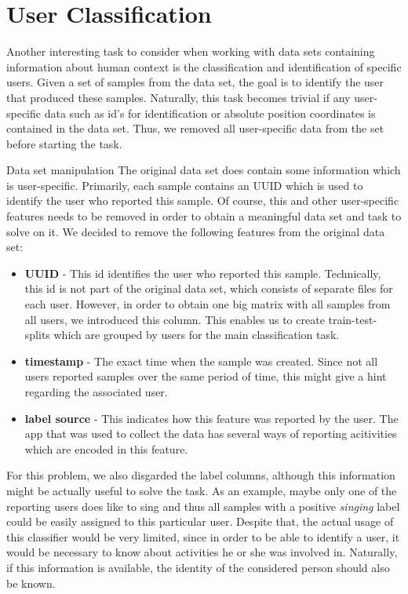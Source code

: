 \section{User Classification}\label{sec:user_classification}
Another interesting task to consider when working with data sets containing information about human context is the classification and identification of specific users. Given a set of samples from the data set, the goal is to identify the user that produced these samples. Naturally, this task becomes trivial if any user-specific data such as id's for identification or absolute position coordinates is contained in the data set. Thus, we removed all user-specific data from the set before starting the task.

\begin{subsection}{Data set manipulation}
	The original data set does contain some information which is user-specific. Primarily, each sample contains an UUID which is used to identify the user who reported this sample. Of course, this and other user-specific features needs to be removed in order to obtain a meaningful data set and task to solve on it. We decided to remove the following features from the original data set:
	\begin{itemize}
		\item \textbf{UUID} - This id identifies the user who reported this sample. Technically, this id is not part of the original data set, which consists of separate files for each user. However, in order to obtain one big matrix with all samples from all users, we introduced this column. This enables us to create train-test-splits which are grouped by users for the main classification task.
		\item \textbf{timestamp} - The exact time when the sample was created. Since not all users reported samples over the same period of time, this might give a hint regarding the associated user.
		\item \textbf{label source} - This indicates how this feature was reported by the user. The app that was used to collect the data has several ways of reporting acitivities which are encoded in this feature.
	\end{itemize}
	For this problem, we also disgarded the label columns, although this information might be actually useful to solve the task. As an example, maybe only one of the reporting users does like to sing and thus all samples with a positive \emph{singing} label could be easily assigned to this particular user. Despite that, the actual usage of this classifier would be very limited, since in order to be able to identify a user, it would be necessary to know about activities he or she was involved in. Naturally, if this information is available, the identity of the considered person should also be known.
\end{subsection}
